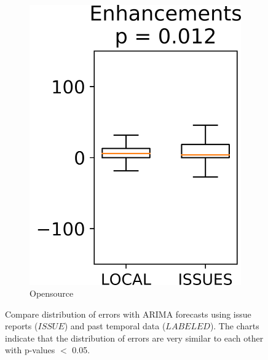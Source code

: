 \begin{figure}[tb!]
\begin{subfigure}[t]{0.49\linewidth}
		\includegraphics[width=0.475\linewidth]{images/RQ4/opensrc/Enhancements.png}
		\caption{Opensource}
	\end{subfigure}%
	\caption{Compare distribution of errors with ARIMA forecasts using issue 
	reports ($\mathit{ISSUE}$) and past temporal data ($\mathit{LABELED}$). The 
	charts indicate that the distribution of errors are very similar to each other 
	with p-values $<$ 0.05.}
	\label{fig:rq4}
\end{figure}
